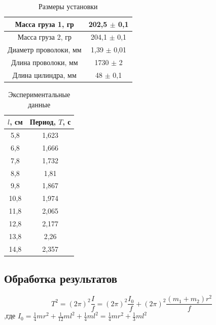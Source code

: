 \documentclass[a4paper]{article}
\begin{document}
\begin{table}[h!]
\begin{center}
\begin{tabular}{|c|c|}
\hline
Масса груза 1, гр     & 202,5 $\pm$ 0,1 \\ \hline
Масса груза 2, гр     & 204,1 $\pm$ 0,1 \\ \hline
Диаметр проволоки, мм & 1,39 $\pm$ 0,01 \\ \hline
Длина проволоки, мм   & 1730 $\pm$ 2    \\ \hline
Длина цилиндра, мм    & 48 $\pm$ 0,1    \\ \hline
\end{tabular}
\caption{Размеры установки}
\end{center}
\end{table}

\begin{table}[h!]
\begin{center}
\begin{tabular}{|c|c|}
\hline
$l$, см & Период, $T$, с \\ \hline
5,8  & 1,623 \\ \hline
6,8  & 1,666 \\ \hline
7,8  & 1,732 \\ \hline
8,8  & 1,81  \\ \hline
9,8  & 1,867 \\ \hline
10,8 & 1,974 \\ \hline
11,8 & 2,065 \\ \hline
12,8 & 2,177 \\ \hline
13,8 & 2,26  \\ \hline
14,8 & 2,357 \\ \hline
\end{tabular}
\caption{Экспериментальные данные}
\end{center}
\end{table}

\newpage
\subsection{Обработка результатов}

\begin{equation}
    T^2 = (2\pi)^2\frac{I}{f} = (2\pi)^2\frac{I_{0}}{f} + (2\pi)^2\frac{(m_{1}+m_{2})r^2}{f}
\end{equation}
,где $I_{0} = \frac{1}{4}mr^2 + \frac{1}{12}ml^2 + \frac{1}{4}ml^2 = \frac{1}{4}mr^2 + \frac{1}{3}ml^2$\\
\end{document}
